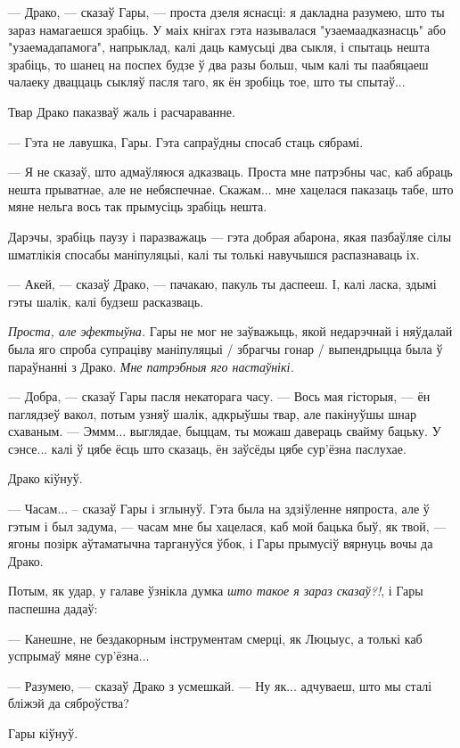 --- Драко, --- сказаў Гары, --- проста дзеля яснасці: я дакладна разумею, што 
ты зараз намагаешся зрабіць. У маіх кнігах гэта называлася "узаемаадказнасць" або
"узаемадапамога", напрыклад, калі даць камусьці два сыкля, і спытаць нешта зрабіць, 
то шанец на поспех будзе ў два разы больш, чым калі ты паабяцаеш чалаеку дваццаць 
сыкляў пасля таго, як ён зробіць тое, што ты спытаў...  

Твар Драко паказваў жаль і расчараванне. 

--- Гэта не лавушка, Гары. Гэта сапраўдны спосаб стаць сябрамі.

--- Я не сказаў, што адмаўляюся адказваць. Проста мне патрэбны час, каб 
абраць нешта прыватнае, але не небяспечнае. Скажам... мне хацелася паказаць табе,
што мяне нельга вось так прымусіць зрабіць нешта.

Дарэчы, зрабіць паузу і паразважаць ---
гэта добрая абарона, якая пазбаўляе сілы шматлікія спосабы маніпуляцыі, 
калі ты толькі навучышся распазнаваць іх.

--- Акей, --- сказаў Драко, --- пачакаю, пакуль ты даспееш. І, калі ласка, 
здымі гэты шалік, калі будзеш расказваць.

\emph{Проста, але эфектыўна.} Гары не мог не заўважыць, якой недарэчнай і няўдалай
была яго спроба супраціву маніпуляцыі / збрагчы гонар / выпендрыцца была ў параўнанні 
з Драко. \emph{Мне патрэбныя яго настаўнікі.}

--- Добра, --- сказаў Гары пасля некаторага часу. --- Вось мая гісторыя, --- ён 
паглядзеў вакол, потым узняў шалік, адкрыўшы твар, але пакінуўшы шнар схаваным. ---
Эммм... выглядае, быццам, ты можаш давераць свайму бацьку. У сэнсе...
калі ў цябе ёсць што сказаць, ён заўсёды цябе сур'ёзна паслухае.

Драко кіўнуў.

--- Часам... -- сказаў Гары і зглынуў. Гэта была на здзіўленне няпроста, але 
ў гэтым і был задума, --- часам мне бы хацелася, каб мой бацька быў, як твой, ---
ягоны позірк аўтаматычна таргануўся  ўбок, і Гары прымусіў вярнуць вочы да Драко. 

Потым, як удар, у галаве ўзнікла думка \emph{што такое я зараз сказаў?!}, і Гары паспешна дадаў:

--- Канешне, не бездакорным інструментам смерці, як Люцыус,
а толькі каб успрымаў мяне сур'ёзна...

--- Разумею, --- сказаў Драко з усмешкай. --- Ну як... адчуваеш, што мы сталі 
бліжэй да сяброўства?

Гары кіўнуў. 

